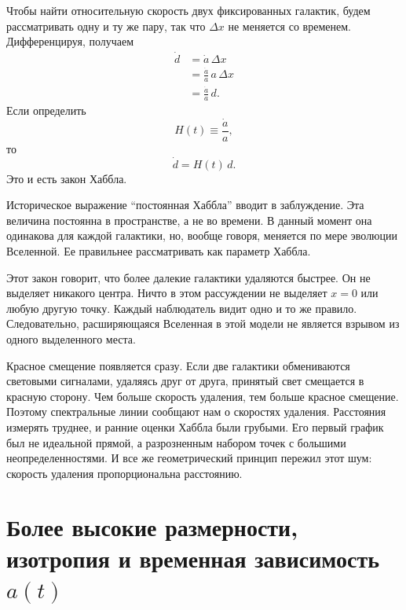 Чтобы найти относительную скорость двух фиксированных галактик, будем рассматривать одну и ту же пару, так что \(\Delta x\) не меняется со временем. Дифференцируя, получаем
\begin{align}
\dot d &= \dot a\,\Delta x \\
       &= \frac{\dot a}{a}\,a\,\Delta x \\
       &= \frac{\dot a}{a}\,d.
\end{align}
Если определить
\begin{equation}
H(t)\equiv \frac{\dot a}{a},
\end{equation}
то
\begin{equation}
\dot d = H(t)\,d.
\end{equation}
Это и есть закон Хаббла.

Историческое выражение ``постоянная Хаббла'' вводит в заблуждение. Эта величина постоянна в пространстве, а не во времени. В данный момент она одинакова для каждой галактики, но, вообще говоря, меняется по мере эволюции Вселенной. Ее правильнее рассматривать как параметр Хаббла.

Этот закон говорит, что более далекие галактики удаляются быстрее. Он не выделяет никакого центра. Ничто в этом рассуждении не выделяет \(x=0\) или любую другую точку. Каждый наблюдатель видит одно и то же правило. Следовательно, расширяющаяся Вселенная в этой модели не является взрывом из одного выделенного места.

Красное смещение появляется сразу. Если две галактики обмениваются световыми сигналами, удаляясь друг от друга, принятый свет смещается в красную сторону. Чем больше скорость удаления, тем больше красное смещение. Поэтому спектральные линии сообщают нам о скоростях удаления. Расстояния измерять труднее, и ранние оценки Хаббла были грубыми. Его первый график был не идеальной прямой, а разрозненным набором точек с большими неопределенностями. И все же геометрический принцип пережил этот шум: скорость удаления пропорциональна расстоянию.

\begin{classroomqa}
\end{classroomqa}

\section{Более высокие размерности, изотропия и временная зависимость \(a(t)\)}

